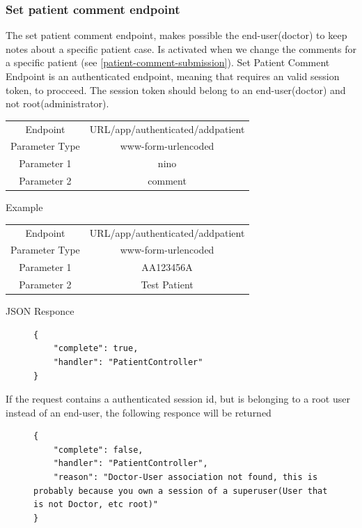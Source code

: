 				\subsubsection{Set patient comment endpoint}
					The set patient comment endpoint, makes possible the end-user(doctor) to keep notes about a specific patient case.
					Is activated when we change the comments for a specific patient (see \ref{patient-comment-submission}). Set Patient 
					Comment Endpoint is an authenticated endpoint, meaning that requires an valid session token, to procceed. The session token 
					should belong to an end-user(doctor) and not root(administrator).
					\begin{center}
						\begin{tabular}{ |c|c| } 
							\hline
							Endpoint & {{URL}}/app/authenticated/addpatient\\
							Parameter Type & www-form-urlencoded  \\
							Parameter 1 & nino\\
							Parameter 2 & comment  \\
							\hline
						\end{tabular}
					\end{center}
					Example
					\begin{center}
						\begin{tabular}{ |c|c| } 
							\hline
							Endpoint & {{URL}}/app/authenticated/addpatient\\
							Parameter Type & www-form-urlencoded  \\
							Parameter 1 & AA123456A\\
							Parameter 2 & Test Patient  \\
							\hline
						\end{tabular}
					\end{center}
					JSON Responce
					\begin{figure}[H]
						\iftrue
						\begin{lstlisting}[]
{
	"complete": true,
	"handler": "PatientController"
}
						\end{lstlisting}
					\end{figure}
					If the request contains a authenticated session id, but is belonging to a root user instead of an end-user, the
					following responce will be returned
					\begin{figure}[H]
						\iftrue
						\begin{lstlisting}[]
{
	"complete": false,
	"handler": "PatientController",
	"reason": "Doctor-User association not found, this is probably because you own a session of a superuser(User that is not Doctor, etc root)"
}
						\end{lstlisting}
					\end{figure}

